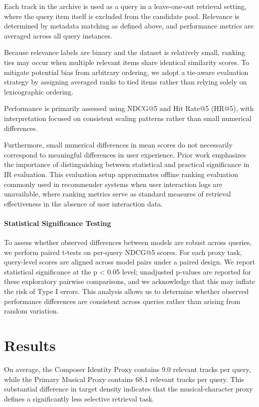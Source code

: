 \documentclass[sigconf]{acmart}
\begin{document}
Each track in the archive is used as a query in a leave-one-out retrieval setting, where the query item itself is excluded from the candidate pool. Relevance is determined by metadata matching as defined above, and performance metrics are averaged across all query instances.

Because relevance labels are binary and the dataset is relatively small, ranking ties may occur when multiple relevant items share identical similarity scores. To mitigate potential bias from arbitrary ordering, we adopt a tie-aware evaluation strategy by assigning averaged ranks to tied items rather than relying solely on lexicographic ordering.

Performance is primarily assessed using NDCG@5 and Hit Rate@5 (HR@5), with interpretation focused on consistent scaling patterns rather than small numerical differences.

Furthermore, small numerical differences in mean scores do not necessarily correspond to meaningful differences in user experience. Prior work emphasizes the importance of distinguishing between statistical and practical significance in IR evaluation\cite{urbano2013}. This evaluation setup approximates offline ranking evaluation commonly used in recommender systems when user interaction logs are unavailable, where ranking metrics serve as standard measures of retrieval effectiveness in the absence of user interaction data.

\paragraph{Statistical Significance Testing}
To assess whether observed differences between models are robust across queries, we perform paired t-tests on per-query NDCG@5 scores. For each proxy task, query-level scores are aligned across model pairs under a paired design. We report statistical significance at the p < 0.05 level; unadjusted p-values are reported for these exploratory pairwise comparisons, and we acknowledge that this may inflate the risk of Type I errors. This analysis allows us to determine whether observed performance differences are consistent across queries rather than arising from random variation.

\section{Results}\label{sec:results}\label{ch:results}
On average, the Composer Identity Proxy contains 9.0 relevant tracks per query, while the Primary Musical Proxy contains 68.1 relevant tracks per query. This substantial difference in target density indicates that the musical-character proxy defines a significantly less selective retrieval task.
\end{document}
